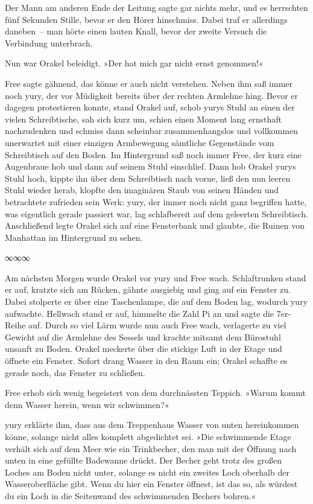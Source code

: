 Der Mann am anderen Ende der Leitung sagte gar nichts mehr, und es herrschten fünf Sekunden Stille, bevor er den Hörer hinschmiss. Dabei traf er allerdings daneben~– man hörte einen lauten Knall, bevor der zweite Versuch die Verbindung unterbrach.

Nun war Orakel beleidigt. »Der hat mich gar nicht ernst genommen!«

Free sagte gähnend, das könne er auch nicht verstehen. Neben ihm saß immer noch yury, der vor Müdigkeit bereits über der rechten Armlehne hing. Bevor er dagegen protestieren konnte, stand Orakel auf, schob yurys Stuhl an einen der vielen Schreibtische, sah sich kurz um, schien einen Moment lang ernsthaft nachzudenken und schmiss dann scheinbar zusammenhangslos und vollkommen unerwartet mit einer einzigen Armbewegung sämtliche Gegenstände vom Schreibtisch auf den Boden. Im Hintergrund saß noch immer Free, der kurz eine Augenbraue hob und dann auf seinem Stuhl einschlief. Dann hob Orakel yurys Stuhl hoch, kippte ihn über dem Schreibtisch nach vorne, ließ den nun leeren Stuhl wieder herab, klopfte den imaginären Staub von seinen Händen und betrachtete zufrieden sein Werk: yury, der immer noch nicht ganz begriffen hatte, was eigentlich gerade passiert war, lag schlafbereit auf dem geleerten Schreibtisch. Anschließend legte Orakel sich auf eine Fensterbank und glaubte, die Ruinen von Manhattan im Hintergrund zu sehen.

\begin{center}
    ∞∞∞
\end{center}

Am nächsten Morgen wurde Orakel vor yury und Free wach. Schlaftrunken stand er auf, kratzte sich am Rücken, gähnte ausgiebig und ging auf ein Fenster zu. Dabei stolperte er über eine Taschenlampe, die auf dem Boden lag, wodurch yury aufwachte. Hellwach stand er auf, himmelte die Zahl Pi an und sagte die 7er-Reihe auf. Durch so viel Lärm wurde nun auch Free wach, verlagerte zu viel Gewicht auf die Armlehne des Sessels und krachte mitsamt dem Bürostuhl unsanft zu Boden. Orakel meckerte über die stickige Luft in der Etage und öffnete ein Fenster. Sofort drang Wasser in den Raum ein; Orakel schaffte es gerade noch, das Fenster zu schließen.

Free erhob sich wenig begeistert von dem durchnässten Teppich. »Warum kommt denn Wasser herein, wenn wir schwimmen?«

yury erklärte ihm, dass aus dem Treppenhaus Wasser von unten hereinkommen könne, solange nicht alles komplett abgedichtet sei. »Die schwimmende Etage verhält sich auf dem Meer wie ein Trinkbecher, den man mit der Öffnung nach unten in eine gefüllte Badewanne drückt. Der Becher geht trotz des großen Loches am Boden nicht unter, solange es nicht ein zweites Loch oberhalb der Wasseroberfläche gibt. Wenn du hier ein Fenster öffnest, ist das so, als würdest du ein Loch in die Seitenwand des schwimmenden Bechers bohren.«

